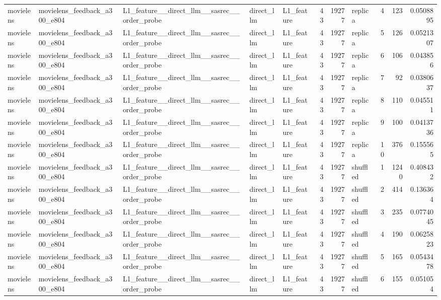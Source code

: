 \begin{table}[htbp!]
\begin{tabular}{lllllrrlrrr}
movielens & movielens\_feedback\_a300\_e804 & L1\_feature\_\_direct\_llm\_\_sasrec\_\_order\_probe & direct\_llm & L1\_feature & 43 & 19277 & replica & 4 & 123 & 0.0508895 \\
movielens & movielens\_feedback\_a300\_e804 & L1\_feature\_\_direct\_llm\_\_sasrec\_\_order\_probe & direct\_llm & L1\_feature & 43 & 19277 & replica & 5 & 126 & 0.0521307 \\
movielens & movielens\_feedback\_a300\_e804 & L1\_feature\_\_direct\_llm\_\_sasrec\_\_order\_probe & direct\_llm & L1\_feature & 43 & 19277 & replica & 6 & 106 & 0.043856 \\
movielens & movielens\_feedback\_a300\_e804 & L1\_feature\_\_direct\_llm\_\_sasrec\_\_order\_probe & direct\_llm & L1\_feature & 43 & 19277 & replica & 7 & 92 & 0.0380637 \\
movielens & movielens\_feedback\_a300\_e804 & L1\_feature\_\_direct\_llm\_\_sasrec\_\_order\_probe & direct\_llm & L1\_feature & 43 & 19277 & replica & 8 & 110 & 0.045511 \\
movielens & movielens\_feedback\_a300\_e804 & L1\_feature\_\_direct\_llm\_\_sasrec\_\_order\_probe & direct\_llm & L1\_feature & 43 & 19277 & replica & 9 & 100 & 0.0413736 \\
movielens & movielens\_feedback\_a300\_e804 & L1\_feature\_\_direct\_llm\_\_sasrec\_\_order\_probe & direct\_llm & L1\_feature & 43 & 19277 & replica & 10 & 376 & 0.155565 \\
movielens & movielens\_feedback\_a300\_e804 & L1\_feature\_\_direct\_llm\_\_sasrec\_\_order\_probe & direct\_llm & L1\_feature & 43 & 19277 & shuffled & 1 & 1240 & 0.408432 \\
movielens & movielens\_feedback\_a300\_e804 & L1\_feature\_\_direct\_llm\_\_sasrec\_\_order\_probe & direct\_llm & L1\_feature & 43 & 19277 & shuffled & 2 & 414 & 0.136364 \\
movielens & movielens\_feedback\_a300\_e804 & L1\_feature\_\_direct\_llm\_\_sasrec\_\_order\_probe & direct\_llm & L1\_feature & 43 & 19277 & shuffled & 3 & 235 & 0.0774045 \\
movielens & movielens\_feedback\_a300\_e804 & L1\_feature\_\_direct\_llm\_\_sasrec\_\_order\_probe & direct\_llm & L1\_feature & 43 & 19277 & shuffled & 4 & 190 & 0.0625823 \\
movielens & movielens\_feedback\_a300\_e804 & L1\_feature\_\_direct\_llm\_\_sasrec\_\_order\_probe & direct\_llm & L1\_feature & 43 & 19277 & shuffled & 5 & 165 & 0.0543478 \\
movielens & movielens\_feedback\_a300\_e804 & L1\_feature\_\_direct\_llm\_\_sasrec\_\_order\_probe & direct\_llm & L1\_feature & 43 & 19277 & shuffled & 6 & 155 & 0.051054 \\

\end{tabular}
\end{table}
